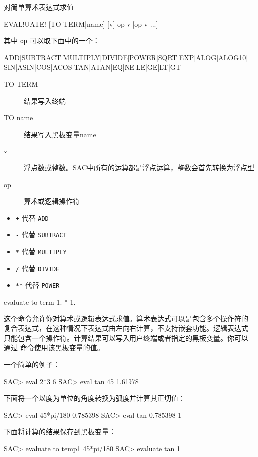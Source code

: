 \label{cmd:evaluate}

对简单算术表达式求值

\begin{SACSTX}
EVAL!UATE! [TO TERM|name] [v] op v [op v ...]
\end{SACSTX}
其中 \texttt{op} 可以取下面中的一个：
\begin{SACSTX}
ADD|SUBTRACT|MULTIPLY|DIVIDE|POWER|SQRT|EXP|ALOG|ALOG10|
SIN|ASIN|COS|ACOS|TAN|ATAN|EQ|NE|LE|GE|LT|GT
\end{SACSTX}

\begin{description}
\item [TO TERM] 结果写入终端
\item [TO name] 结果写入黑板变量name
\item [v] 浮点数或整数。SAC中所有的运算都是浮点运算，整数会首先转换为浮点型
\item [op] 算术或逻辑操作符
\end{description}

\begin{itemize}
\item \texttt{+} 代替 \texttt{ADD}
\item \texttt{-} 代替 \texttt{SUBTRACT}
\item \texttt{*} 代替 \texttt{MULTIPLY}
\item \texttt{/} 代替 \texttt{DIVIDE}
\item \texttt{**} 代替 \texttt{POWER}
\end{itemize}

\begin{SACDFT}
evaluate to term 1. * 1.
\end{SACDFT}

这个命令允许你对算术或逻辑表达式求值。算术表达式可以是包含多个操作符的
复合表达式，在这种情况下表达式由左向右计算，不支持嵌套功能。逻辑表达式
只能包含一个操作符。计算结果可以写入用户终端或者指定的黑板变量。你可以
通过  命令使用该黑板变量的值。

一个简单的例子：
\begin{SACCode}
SAC> eval 2*3
 6
SAC> eval tan 45
1.61978
\end{SACCode}

下面将一个以度为单位的角度转换为弧度并计算其正切值：
\begin{SACCode}
SAC> eval 45*pi/180
 0.785398
SAC> eval tan 0.785398
 1
\end{SACCode}

下面将计算的结果保存到黑板变量：
\begin{SACCode}
SAC> evaluate to temp1 45*pi/180
SAC> evaluate tan %
 1
\end{SACCode}

